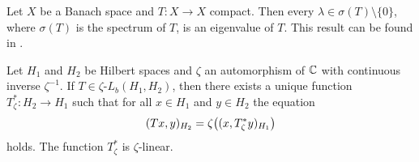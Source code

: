 \begin{remark} \label{remark:compact_spectrum}
	Let $X$ be a Banach space and $T: X \to X$ compact. Then every $\lambda \in \sigma(T) \setminus\{0\}$, where $\sigma(T)$ is the spectrum of $T$, is an eigenvalue of $T$. This result can be found in \cite[p.138]{FAna1}.
\end{remark}

\begin{lemma}
	Let $H_1$ and $H_2$ be Hilbert spaces and $\zeta$ an automorphism of $\mathbb{C}$ with continuous inverse $\zeta^{-1}$. If $T \in \zeta\text{-}L_b(H_1, H_2)$, then there exists a unique function $T_\zeta^\ast: H_2 \to H_1$ such that for all $x \in H_1$ and $y \in H_2$ the equation 
	\begin{align*}
		(Tx, y)_{H_2} = \zeta{\left ( (x, T_\zeta^\ast y)_{H_1} \right )}
	\end{align*}
	holds. The function $T_\zeta^\ast$ is $\zeta$-linear.
\end{lemma}

